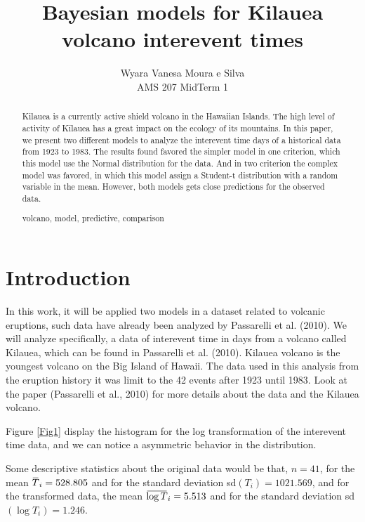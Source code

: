 \documentclass{asaproc}
\title{Bayesian models for Kilauea volcano interevent times}
\author{Wyara Vanesa Moura e Silva\\
AMS 207 MidTerm 1\\}
\newcommand{\overbar}[1]{\mkern 1.5mu\overline{\mkern-1.5mu#1\mkern-1.5mu}\mkern 1.5mu}
\begin{document}
\maketitle


\begin{abstract}

Kilauea is a currently active shield volcano in the Hawaiian Islands. The high level of activity of Kīlauea has a great impact on the ecology of its mountains. In this paper, we present two different models to analyze the interevent time days of a historical data from 1923 to 1983. The results found favored the simpler model in one criterion, which this model use the Normal distribution for the data. And in two criterion the complex model was favored, in which this model assign a Student-t distribution with a random variable in the mean. However, both models gets close predictions for the observed data.

\begin{keywords}
volcano, model, predictive, comparison
\end{keywords}
\end{abstract}

\section{Introduction}

In this work, it will be applied two models in a dataset related to volcanic eruptions, such data have already been analyzed by Passarelli et al. (2010). We will analyze specifically, a data of interevent time in days from a volcano called Kilauea, which can be found in  Passarelli et al. (2010). Kilauea volcano is the youngest volcano on the Big Island of Hawaii. The data used in this analysis from the eruption history it was limit to the 42 events after 1923 until 1983. Look at the paper (Passarelli et al., 2010) for more details about the data and the Kilauea volcano.

Figure \ref{Fig1} display the histogram for the log transformation of the interevent time data, and we can notice a asymmetric behavior in the distribution.%

Some descriptive statistics about the original data would be that, $n=41$, for the mean $\overbar{T}_i = 528.805$ and for the standard deviation sd$(T_i) = 1021.569$, and for the transformed data, the mean $\overbar{\log T}_i = 5.513$ and for the standard deviation sd$(\log T_i) = 1.246$.
\end{document}
